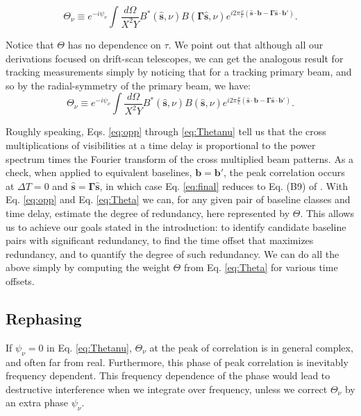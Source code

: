 \documentclass[twocolumn,apj,numberedappendix]{emulateapj}
\renewcommand\[{\begin{equation}}
\renewcommand\]{\end{equation}}
\begin{document}
\[
\Theta_{\nu} \equiv e^{-i\psi_{\nu}} \int \frac{d\Omega}{X^{2}Y}B^{*}(\hat{\boldsymbol{s}},\nu)B(\boldsymbol{\Gamma}\hat{\boldsymbol{s}},\nu) e^{i2\pi\frac{\nu}{c}\left(\hat{\boldsymbol{s}}\cdot\boldsymbol{b}-\boldsymbol{\Gamma}\hat{\boldsymbol{s}}\cdot\boldsymbol{b'}\right)}.
\label{eq:Thetanu}
\]


Notice that $\Theta$ has no dependence on $\tau$. We point out that although all our derivations focused on drift-scan telescopes, we can get the analogous result for tracking measurements simply by noticing that for a tracking primary beam, and so by the radial-symmetry of the primary beam, we have:
\[
\Theta_{\nu} \equiv e^{-i\psi_{\nu}} \int \frac{d\Omega}{X^{2}Y}B^{*}(\hat{\boldsymbol{s}},\nu)B(\hat{\boldsymbol{s}},\nu) e^{i2\pi\frac{\nu}{c}\left(\hat{\boldsymbol{s}}\cdot\boldsymbol{b}-\boldsymbol{\Gamma}\hat{\boldsymbol{s}}\cdot\boldsymbol{b'}\right)}.
\label{eq:Thetanu_tracking}
\]

Roughly speaking, Eqs. \eqref{eq:opp} through \eqref{eq:Thetanu} tell us that the cross multiplications of visibilities at a time delay is proportional to the power spectrum times the Fourier
transform of the cross multiplied beam patterns. As a check, when applied to equivalent baselines,
$\boldsymbol{b}=\boldsymbol{b'}$, the peak correlation occurs at $\Delta T=0$ and $\hat{\boldsymbol{s}}=\boldsymbol{\Gamma}\hat{\boldsymbol{s}}$, in which case Eq. \eqref{eq:final} reduces to Eq. (B9) of \cite{paper32}. 
With Eq. \eqref{eq:opp} and Eq. \eqref{eq:Theta} we can, for any given pair of baseline classes and time delay, estimate the degree of redundancy, here represented by $\Theta$. This allows us to achieve our goals stated in the introduction: to identify 
candidate baseline pairs with significant redundancy, to find the time offset that maximizes redundancy, and to quantify the degree of such redundancy. We can do all the above simply by computing the weight $\Theta$ from
Eq. \eqref{eq:Theta} for various time offsets. 



\subsection{Rephasing \label{sec:rephs}}
If $\psi_{\nu}=0$ in  Eq. \eqref{eq:Thetanu}, $\Theta_{\nu}$ at the peak of correlation is in general complex, and often far from real. Furthermore, this phase of peak correlation is inevitably frequency dependent. This frequency dependence of the phase would lead to destructive interference when we integrate over frequency, unless we correct $\Theta_{\nu}$ by an extra phase $\psi_\nu$. 
\end{document}
